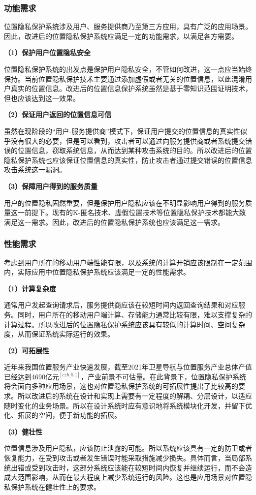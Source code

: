 \documentclass[zihao=-4]{ctexart}
\begin{document}
\subsubsection{功能需求}
位置隐私保护系统涉及用户、服务提供商乃至第三方应用，具有广泛的应用场景。因此，改进后的位置隐私保护系统应满足一定的功能需求，以满足各方需要。
\par 
\textbf{（1）保护用户位置隐私安全}
\par 
位置隐私保护系统的出发点是保护用户隐私安全，不管如何改进，这一点应当始终保持。当前位置隐私保护技术主要通过添加虚假或者无关的位置信息，以此混淆用户真实的位置信息。改进后的位置信息保护系统虽然是基于零知识范围证明技术，但也应该达到这一效果。
\par 
\textbf{（2）保证用户返回的位置信息可信}
\par 
虽然在现阶段的“用户-服务提供商”模式下，保证用户提交的位置信息的真实性似乎没有很大的必要，但是可以看到，攻击者可以通过向服务提供商或者系统提交错误的位置信息，窃取系统信息，从而达到某种攻击系统的目的。所以改进后的位置隐私保护系统也应该保证位置信息的真实性，防止攻击者通过提交错误的位置信息攻击系统这一漏洞。
\par 
\textbf{（3）保障用户得到的服务质量}
\par 
用户的位置隐私固然重要，但是保护用户隐私应该在不明显影响用户得到的服务质量这一前提下。现有的K-匿名技术、虚假位置技术等位置隐私保护技术都能大致满足这一需求。因此，改进后的位置隐私保护系统也应该满足这一需求。

\subsubsection{性能需求}
考虑到用户所在的移动用户端性能有限，以及系统的计算开销应该限制在一定范围内，实际应用中位置隐私保护系统应该满足一定的性能需求。
\par 
\textbf{（1）计算复杂度}
\par 
通常用户发起查询请求后，服务提供商应该在较短时间内返回查询结果和对应服务。同时，用户所在的移动用户端计算、存储能力通常比较有限，难以支撑复杂的计算过程。所以改进后的位置隐私保护系统应该具有较低的计算时间、空间复杂度，从而保证系统实际运行的效果。
\par 
\textbf{（2）可拓展性}
\par 
近年来我国位置服务产业快速发展，截至2021年卫星导航与位置服务产业总体产值已经达到4690亿元$^{[czh\_5.1]}$，产业前景不可估量。在此背景下，位置隐私保护系统将会面向多种应用场景，这也对位置隐私保护系统的可拓展性提出了比较高的要求。所以改进后的系统在设计和实现上需要有一定程度的解耦、分层设计，以适应随时变化的业务场景。所以在设计系统时应有意识地将系统模块化开发，并留下优化、拓展的空间，便于新功能的拓展。
\par 
\textbf{（3）健壮性}
\par 
位置信息涉及用户隐私，应该防止泄露的可能。所以系统应该具有一定的防卫或者恢复能力，在受到攻击或者发生错误时能采取措施减少损失。具体而言，当局部系统出错或受到攻击时，这部分系统应该能在较短时间内恢复并继续运行，而不会造成大范围影响，从而在最大程度上减少系统运行的风险。这也是应用场景对位置隐私保护系统在健壮性上的要求。
\end{document}
